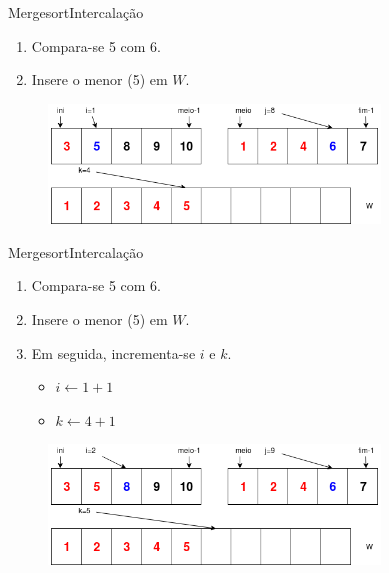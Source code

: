 \documentclass[aspectratio=169]{beamer}
\begin{document}
\begin{frame}{Mergesort}{Intercalação}
\begin{enumerate}
 \item Compara-se 5 com 6.
 \item Insere o menor (5) em $W$.
\end{enumerate}

\begin{figure}[!h]
  \centering
  \includegraphics[width=250pt]{imgs/merge/merge5_1.png}
  \label{fig_merge5_1}
\end{figure}
\end{frame}


\begin{frame}{Mergesort}{Intercalação}
\begin{enumerate}
 \item Compara-se 5 com 6.
 \item Insere o menor (5) em $W$.
 \item Em seguida, incrementa-se $i$ e $k$.
 \begin{itemize}
 \item $i\leftarrow 1 + 1$
 \item $k\leftarrow 4 + 1$
 \end{itemize}   
\end{enumerate}

\begin{figure}[!h]
  \centering
  \includegraphics[width=250pt]{imgs/merge/merge6.png}
  \label{fig_merge5_2}
\end{figure}
\end{frame}

\end{document}
